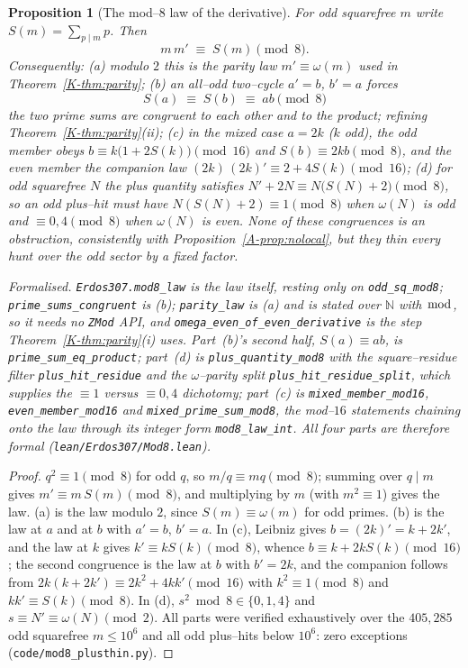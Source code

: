 \documentclass[11pt]{article}
\newtheorem{proposition}[theorem]{Proposition}
\theoremstyle{definition}
\newcommand{\NN}{\mathbb{N}}
\begin{document}
\begin{proposition}[The mod--$8$ law of the derivative]\label{prop:mod8}
For odd squarefree $m$ write $S(m)=\sum_{p\mid m}p$. Then
\[ m\,m'\;\equiv\;S(m)\pmod 8. \]
Consequently: \textup{(a)} modulo $2$ this is the parity law $m'\equiv\omega(m)$ used in
Theorem~\ref{K-thm:parity}; \textup{(b)} an all--odd two--cycle $a'=b$, $b'=a$ forces
\[ S(a)\;\equiv\;S(b)\;\equiv\;ab\pmod 8 \]
the two prime sums are congruent to each other and to the product; refining
Theorem~\ref{K-thm:parity}(ii); \textup{(c)} in the mixed case $a=2k$ ($k$ odd), the odd member obeys
$b\equiv k\bigl(1+2S(k)\bigr)\pmod{16}$ and $S(b)\equiv2kb\pmod8$, and the even member the companion
law $(2k)\,(2k)'\equiv2+4S(k)\pmod{16}$; \textup{(d)} for odd squarefree $N$ the plus quantity
satisfies $N'+2N\equiv N\bigl(S(N)+2\bigr)\pmod8$, so an odd plus--hit must have
$N(S(N)+2)\equiv1\pmod8$ when $\omega(N)$ is odd and $\equiv0,4\pmod8$ when $\omega(N)$ is even.
None of these congruences is an obstruction, consistently with Proposition~\ref{A-prop:nolocal},
but they thin every hunt over the odd sector by a fixed factor.

\textup{Formalised.} \texttt{Erdos307.mod8\_law} is the law itself, resting only on
\texttt{odd\_sq\_mod8}; \texttt{prime\_sums\_congruent} is \textup{(b)}; \texttt{parity\_law} is
\textup{(a)} and is stated over $\NN$ with $\bmod$, so it needs no \texttt{ZMod} API, and
\texttt{omega\_even\_of\_even\_derivative} is the step Theorem~\ref{K-thm:parity}\textup{(i)} uses.
Part~\textup{(b)}'s second half, $S(a)\equiv ab$, is
\texttt{prime\_sum\_eq\_product}; part~\textup{(d)} is \texttt{plus\_quantity\_mod8} with the
square--residue filter \texttt{plus\_hit\_residue} and the $\omega$--parity split
\texttt{plus\_hit\_residue\_split}, which supplies the $\equiv1$ versus $\equiv0,4$ dichotomy;
part~\textup{(c)} is
\texttt{mixed\_member\_mod16}, \texttt{even\_member\_mod16} and \texttt{mixed\_prime\_sum\_mod8},
the mod--$16$ statements chaining onto the law through its integer form \texttt{mod8\_law\_int}. All
four parts are therefore formal \textup{(\texttt{lean/Erdos307/Mod8.lean})}.
\end{proposition}
\begin{proof}
$q^2\equiv1\pmod8$ for odd $q$, so $m/q\equiv mq\pmod8$; summing over $q\mid m$ gives
$m'\equiv m\,S(m)\pmod8$, and multiplying by $m$ (with $m^2\equiv1$) gives the law. (a) is the law
modulo $2$, since $S(m)\equiv\omega(m)$ for odd primes. (b) is the law at $a$ and at $b$ with $a'=b$,
$b'=a$. In (c), Leibniz gives $b=(2k)'=k+2k'$, and the law at $k$ gives $k'\equiv kS(k)\pmod8$,
whence $b\equiv k+2kS(k)\pmod{16}$; the second congruence is the law at $b$ with $b'=2k$, and the
companion follows from $2k(k+2k')\equiv2k^2+4kk'\pmod{16}$ with $k^2\equiv1\pmod8$ and
$kk'\equiv S(k)\pmod8$. In (d), $s^2\bmod8\in\{0,1,4\}$ and $s\equiv N'\equiv\omega(N)\pmod2$.
All parts were verified exhaustively over the $405{,}285$ odd squarefree $m\le10^6$ and all odd
plus--hits below $10^6$: zero exceptions (\texttt{code/mod8\_plusthin.py}).
\end{proof}
\end{document}
